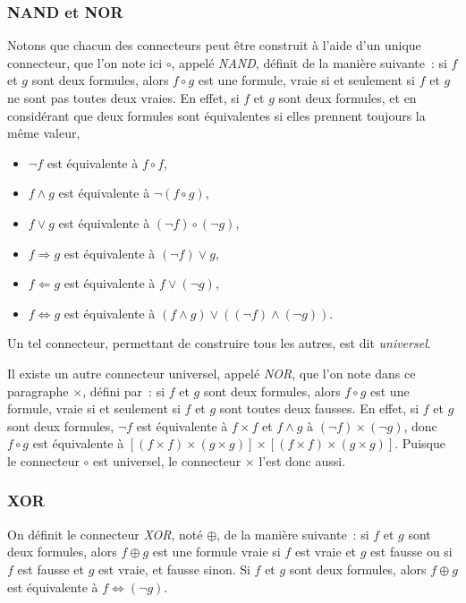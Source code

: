 \subsubsection{NAND et NOR}

Notons que chacun des connecteurs peut être construit à l'aide d'un unique connecteur, que l'on  note ici $\circ$, appelé \textit{NAND}, définit de la manière suivante : si $f$ et $g$ sont deux formules, alors $f \circ g$ est une formule, vraie si et seulement si $f$ et $g$ ne sont pas toutes deux vraies. 
En effet, si $f$ et $g$ sont deux formules, et en considérant que deux formules sont équivalentes si elles prennent toujours la même valeur,
\begin{itemize}
    \item $\neg f$ est équivalente à $f \circ f$,
    \item $f \wedge g$ est équivalente à $\neg (f \circ g)$,
    \item $f \vee g$ est équivalente à $(\neg f) \circ (\neg g)$,
    \item $f \Rightarrow g$ est équivalente à $(\neg f) \vee g$,
    \item $f \Leftarrow g$ est équivalente à $f \vee (\neg g)$,
    \item $f \Leftrightarrow g$ est équivalente à $(f \wedge g) \vee ((\neg f) \wedge (\neg g))$.
\end{itemize}
Un tel connecteur, permettant de construire tous les autres, est dit \textit{universel}.

Il existe un autre connecteur universel, appelé \textit{NOR}, que l'on note dans ce paragraphe $\times$, défini par : si $f$ et $g$ sont deux formules, alors $f \circ g$ est une formule, vraie si et seulement si $f$ et $g$ sont toutes deux fausses. 
En effet, si $f$ et $g$ sont deux formules, $\neg f$ est équivalente à $f \times f$ et $f \wedge g$ à $(\neg f) \times (\neg g)$, donc $f \circ g$ est équivalente à $[(f \times f) \times (g \times g)] \times [(f \times f) \times (g \times g)]$. 
Puisque le connecteur $\circ$ est universel, le connecteur $\times$ l'est donc aussi.

\subsubsection{XOR} 
\label{subsub:XOR}

On définit le connecteur \textit{XOR}, noté $\oplus$, de la manière suivante : si $f$ et $g$ sont deux formules, alors $f \oplus g$ est une formule vraie si $f$ est vraie et $g$ est fausse ou si $f$ est fausse et $g$ est vraie, et fausse sinon. 
Si $f$ et $g$ sont deux formules, alors $f \oplus g$ est équivalente à $f \Leftrightarrow (\neg g)$. 

